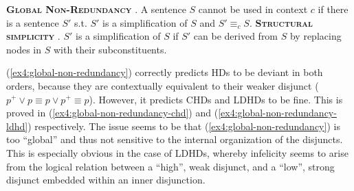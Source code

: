 \begin{exe}
	 {\textsc{\textbf{Global Non-Redundancy}} \parencite{Meyer2013,Mayr2016}. A sentence $S$ cannot be used in context $c$ if there is a sentence $S'$ s.t. $S'$ is a simplification of $S$ and $S' \equiv_c S$.}
	 {\textsc{\textbf{Structural simplicity}} \parencite{Katzir2007}. $S'$ is a simplification of $S$ if $S'$ can be derived from $S$ by replacing nodes in $S$ with their subconstituents.}
\end{exe}


(\ref{ex4:global-non-redundancy}) correctly predicts HDs to be deviant in both orders, because they are contextually equivalent to their weaker disjunct ($p^+\vee p \equiv p\vee p^+ \equiv p$).
However, it predicts CHDs and LDHDs to be fine. This is proved in (\ref{ex4:global-non-redundancy-chd}) and (\ref{ex4:global-non-redundancy-ldhd}) respectively. The issue seems to be that (\ref{ex4:global-non-redundancy}) is too ``global'' and thus not sensitive to the internal organization of the disjuncts. This is especially obvious in the case of LDHDs, whereby infelicity seems to arise from the logical relation between a ``high'', weak disjunct, and a ``low'', strong disjunct embedded within an inner disjunction.

\begin{exe}
	\label{ex4:global-non-redundancy-chd}
	\label{ex4:global-non-redundancy-ldhd}
\end{exe}


